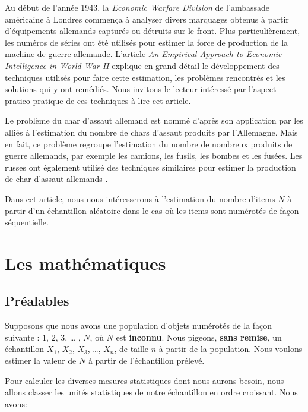 \documentclass[10pt]{article}
\begin{document}
Au début de l'année 1943, la \emph{Economic Warfare Division} de
l'ambassade américaine à Londres commença à analyser divers marquages
obtenus à partir d'équipements allemands capturés ou détruits sur le
front. Plus particulièrement, les numéros de séries ont été utilisés
pour estimer la force de production de la machine de guerre allemande.
L'article \emph{An Empirical Approach to Economic Intelligence in World
War II} \cite{Ruggles1947} explique en grand détail le développement des
techniques utilisés pour faire cette estimation, les problèmes
rencontrés et les solutions qui y ont remédiés. Nous invitons le lecteur
intéressé par l'aspect pratico-pratique de ces techniques à lire cet
article.

Le problème du char d'assaut allemand est nommé d'après son application
par les alliés à l'estimation du nombre de chars d'assaut produits par
l'Allemagne. Mais en fait, ce problème regroupe l'estimation du nombre
de nombreux produits de guerre allemands, par exemple les camions, les
fusils, les bombes et les fusées. Les russes ont également utilisé des
techniques similaires pour estimer la production de char d'assaut
allemands \cite{Volz2008}.

Dans cet article, nous nous intéresserons à l'estimation du nombre
d'items \(N\) à partir d'un échantillon aléatoire dans le cas où les
items sont numérotés de façon séquentielle.

\hypertarget{les-mathematiques}{%
\section{\texorpdfstring{Les mathématiques
\label{maths}}{Les mathématiques }}\label{les-mathematiques}}

\hypertarget{prealables}{%
\subsection{Préalables}\label{prealables}}

Supposons que nous avons une population d'objets numérotés de la façon
suivante : \(1\), \(2\), \(3\), \ldots{} , \(N\), où \(N\) est
\textbf{inconnu}. Nous pigeons, \textbf{\textbf{sans remise}}, un
échantillon \(X_1\), \(X_2\), \(X_3\), \ldots{}, \(X_n\), de taille
\(n\) à partir de la population. Nous voulons estimer la valeur de \(N\)
à partir de l'échantillon prélevé.

Pour calculer les diverses mesures statistiques dont nous aurons besoin,
nous allons classer les unités statistiques de notre échantillon en
ordre croissant. Nous avons:
\end{document}
